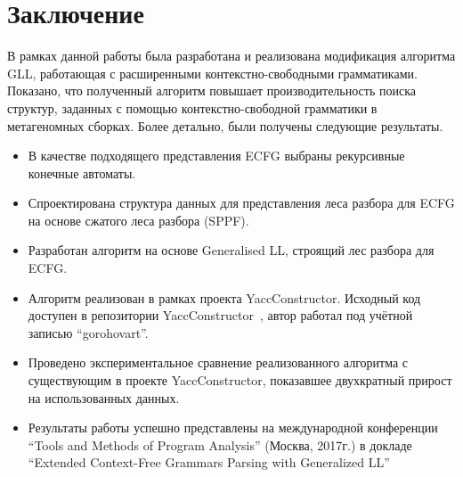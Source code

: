 \documentclass[14pt]{matmex-diploma-custom}
\begin{document}
	\section*{Заключение}
	В рамках данной работы была разработана и реализована модификация алгоритма GLL,
	работающая с расширенными контекстно-свободными грамматиками. Показано, что полученный
	алгоритм повышает производительность поиска структур, заданных с помощью контекстно-свободной
	грамматики в метагеномных сборках. Более детально, были получены следующие результаты.
	\begin{itemize}
		\item В качестве подходящего представления ECFG выбраны рекурсивные конечные автоматы.
		\item Спроектирована структура данных для представления леса разбора для ECFG 
		на основе сжатого леса разбора (SPPF).
		\item Разработан алгоритм на основе Generalised LL, строящий лес разбора для ECFG.
		\item Алгоритм реализован в рамках проекта YaccConstructor. Исходный код доступен в
              репозитории YaccConstructor~\cite{YCUrl}, автор работал под учётной записью ``gorohovart''.
		\item Проведено экспериментальное сравнение реализованного алгоритма с существующим в проекте YaccConstructor,
         показавшее двухкратный прирост на использованных данных.
		\item Результаты работы успешно представлены на международной конференции
		``Tools and Methods of Program Analysis'' (Москва, 2017г.) в докладе ``Extended Context-Free Grammars Parsing with Generalized LL''
	\end{itemize}
	
	\setmonofont[Mapping=tex-text]{CMU Typewriter Text}
	
	
	
\end{document}
